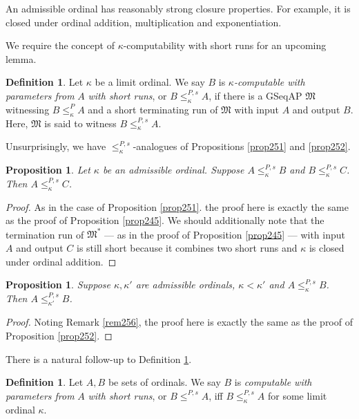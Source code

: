\documentclass[12pt, twoside]{memoir}
\numberwithin{equation}{section}
\newtheorem{prop}[thm]{Proposition}
\theoremstyle{definition}
\newtheorem{defi}[thm]{Definition}
\theoremstyle{remark}
\theoremstyle{definition}
\theoremstyle{definition}
\theoremstyle{definition}
\theoremstyle{remark}
\begin{document}
An admissible ordinal has reasonably strong closure properties. For example, it is closed under ordinal addition, multiplication and exponentiation.

We require the concept of $\kappa$-computability with short runs for an upcoming lemma.

\begin{defi}\label{def269p}
Let $\kappa$ be a limit ordinal. We say $B$ is $\kappa$\emph{-computable with parameters from} $A$ \emph{with short runs}, or $B \leq^{P, s}_{\kappa} A$, if there is a GSeqAP $\mathfrak{M}$ witnessing $B \leq^P_{\kappa} A$ and a short terminating run of $\mathfrak{M}$ with input $A$ and output $B$. Here, $\mathfrak{M}$ is said to witness $B \leq^{P, s}_{\kappa} A$.
\end{defi}

Unsurprisingly, we have $\leq^{P, s}_{\kappa}$-analogues of Propositions \ref{prop251} and \ref{prop252}.

\begin{prop}\label{prop270n}
Let $\kappa$ be an admissible ordinal. Suppose $A \leq^{P, s}_{\kappa} B$ and $B \leq^{P, s}_{\kappa} C$. Then $A \leq^{P, s}_{\kappa} C$.
\end{prop}

\begin{proof}
As in the case of Proposition \ref{prop251}. the proof here is exactly the same as the proof of Proposition \ref{prop245}. We should additionally note that the termination run of $\mathfrak{M}^*$ --- as in the proof of Proposition \ref{prop245} --- with input $A$ and output $C$ is still short because it combines two short runs and $\kappa$ is closed under ordinal addition.
\end{proof}

\begin{prop}\label{prop271n}
Suppose $\kappa, \kappa'$ are admissible ordinals, $\kappa < \kappa'$ and $A \leq^{P, s}_{\kappa} B$. Then $A \leq^{P, s}_{\kappa'} B$.
\end{prop}

\begin{proof}
Noting Remark \ref{rem256}, the proof here is exactly the same as the proof of Proposition \ref{prop252}.
\end{proof}

There is a natural follow-up to Definition \ref{def269p}.

\begin{defi}\label{def8329}
Let $A, B$ be sets of ordinals. We say $B$ is \emph{computable with parameters from} $A$ \emph{with short runs}, or $B \leq^{P, s} A$, iff $B \leq^{P, s}_{\kappa} A$ for some limit ordinal $\kappa$.
\end{defi}
\end{document}
